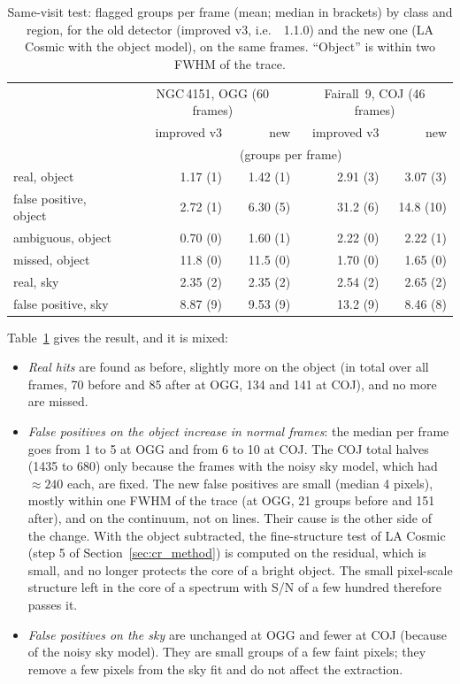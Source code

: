 \begin{table}[!htbp]
\centering
\caption{Same-visit test: flagged groups per frame (mean; median in brackets) by class and region, for the old detector
(improved v3, i.e.\ \banzai{}~1.1.0) and the new one (LA Cosmic with the object model), on the same frames. ``Object'' is within two FWHM of the trace.}
\label{tab:cr_pairs}
\small
\begin{tabular}{@{}lrrrr@{}}
\toprule
 & \multicolumn{2}{c}{NGC\,4151, OGG (60 frames)} & \multicolumn{2}{c}{Fairall~9, COJ (46 frames)} \\
 & improved v3 & new & improved v3 & new \\
 & \multicolumn{4}{c}{(groups per frame)} \\
\midrule
real, object & 1.17 (1) & 1.42 (1) & 2.91 (3) & 3.07 (3) \\
false positive, object & 2.72 (1) & 6.30 (5) & 31.2 (6) & 14.8 (10) \\
ambiguous, object & 0.70 (0) & 1.60 (1) & 2.22 (0) & 2.22 (1) \\
missed, object & 11.8 (0) & 11.5 (0) & 1.70 (0) & 1.65 (0) \\
real, sky & 2.35 (2) & 2.35 (2) & 2.54 (2) & 2.65 (2) \\
false positive, sky & 8.87 (9) & 9.53 (9) & 13.2 (9) & 8.46 (8) \\
\bottomrule
\end{tabular}
\end{table}

Table~\ref{tab:cr_pairs} gives the result, and it is mixed:
\begin{itemize}
\item \textit{Real hits} are found as before, slightly more on the object (in total over all frames, 70 before and 85
after at OGG, 134 and 141 at COJ), and no more are missed.
\item \textit{False positives on the object increase in normal frames}: the median per frame goes from 1 to 5 at OGG
and from 6 to 10 at COJ. The COJ total halves (1435 to 680) only because the frames with the noisy sky model, which had
$\approx240$ each, are fixed. The new false positives are small (median 4 pixels), mostly within one FWHM of the trace
(at OGG, 21 groups before and 151 after), and on the continuum, not on lines. Their cause is the other side of the
change. With the object subtracted, the fine-structure test of LA Cosmic (step 5 of Section~\ref{sec:cr_method}) is
computed on the residual, which is small, and no longer protects the core of a bright object. The small pixel-scale
structure left in the core of a spectrum with S/N of a few hundred therefore passes it.
\item \textit{False positives on the sky} are unchanged at OGG and fewer at COJ (because of the noisy sky model). They
are small groups of a few faint pixels; they remove a few pixels from the sky fit and do not affect the extraction.
\end{itemize}

